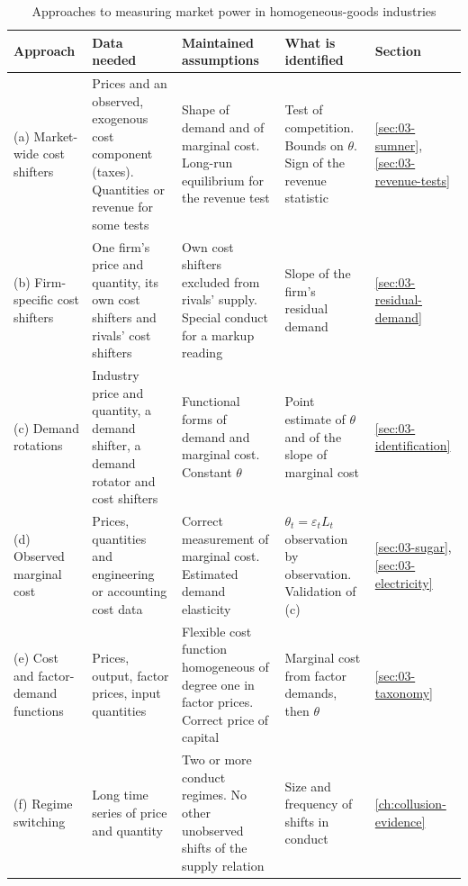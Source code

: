 \begin{table}[!htb]
\centering
\begin{threeparttable}
\caption{Approaches to measuring market power in homogeneous-goods industries}
\label{tab:03-taxonomy}
\footnotesize
\setlength{\tabcolsep}{3.5pt}
\begin{tabularx}{\textwidth}{@{}>{\raggedright\arraybackslash}p{2.3cm}
  >{\raggedright\arraybackslash}X >{\raggedright\arraybackslash}X >{\raggedright\arraybackslash}X
  >{\raggedright\arraybackslash}p{1.5cm}@{}}
\toprule
Approach & Data needed & Maintained assumptions & What is identified & Section \\
\midrule
(a) Market-wide cost shifters & Prices and an observed, exogenous cost component (taxes). Quantities or revenue for
  some tests & Shape of demand and of marginal cost. Long-run equilibrium for the revenue test & Test of competition.
  Bounds on $\theta$. Sign of the revenue statistic & \ref{sec:03-sumner}, \ref{sec:03-revenue-tests} \\
\addlinespace
(b) Firm-specific cost shifters & One firm's price and quantity, its own cost shifters and rivals' cost shifters & Own
  cost shifters excluded from rivals' supply. Special conduct for a markup reading & Slope of the firm's residual
  demand & \ref{sec:03-residual-demand} \\
\addlinespace
(c) Demand rotations & Industry price and quantity, a demand shifter, a demand rotator and cost shifters & Functional
  forms of demand and marginal cost. Constant $\theta$ & Point estimate of $\theta$ and of the slope of marginal cost &
  \ref{sec:03-identification} \\
\addlinespace
(d) Observed marginal cost & Prices, quantities and engineering or accounting cost data & Correct measurement of
  marginal cost. Estimated demand elasticity & $\theta_t = \varepsilon_t L_t$ observation by observation. Validation
  of (c) & \ref{sec:03-sugar}, \ref{sec:03-electricity} \\
\addlinespace
(e) Cost and factor-demand functions & Prices, output, factor prices, input quantities & Flexible cost function
  homogeneous of degree one in factor prices. Correct price of capital & Marginal cost from factor demands, then
  $\theta$ & \ref{sec:03-taxonomy} \\
\addlinespace
(f) Regime switching & Long time series of price and quantity & Two or more conduct regimes. No other unobserved
  shifts of the supply relation & Size and frequency of shifts in conduct & \cref{ch:collusion-evidence} \\

\end{tabularx}
\end{threeparttable}
\end{table}
